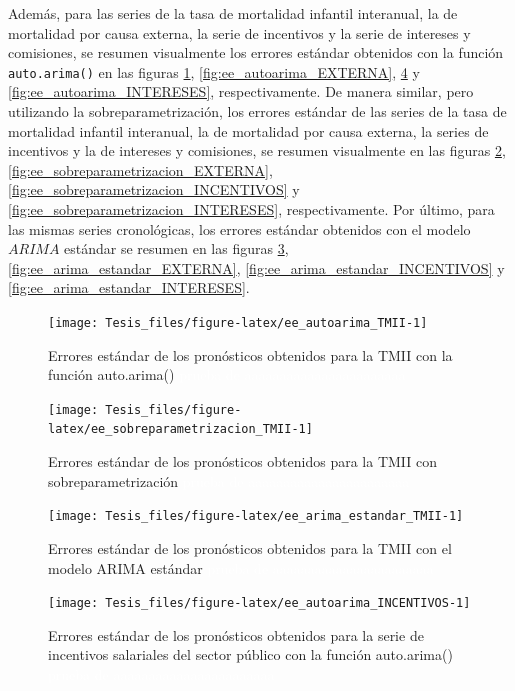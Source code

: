 \documentclass[
]{article}
\begin{document}
Además, para las series de la tasa de mortalidad infantil interanual, la
de mortalidad por causa externa, la serie de incentivos y la serie de
intereses y comisiones, se resumen visualmente los errores estándar
obtenidos con la función \texttt{auto.arima()} en las figuras
\ref{fig:ee_autoarima_TMII}, \ref{fig:ee_autoarima_EXTERNA},
\ref{fig:ee_autoarima_INCENTIVOS} y \ref{fig:ee_autoarima_INTERESES},
respectivamente. De manera similar, pero utilizando la
sobreparametrización, los errores estándar de las series de la tasa de
mortalidad infantil interanual, la de mortalidad por causa externa, la
series de incentivos y la de intereses y comisiones, se resumen
visualmente en las figuras \ref{fig:ee_sobreparametrizacion_TMII},
\ref{fig:ee_sobreparametrizacion_EXTERNA},
\ref{fig:ee_sobreparametrizacion_INCENTIVOS} y
\ref{fig:ee_sobreparametrizacion_INTERESES}, respectivamente. Por
último, para las mismas series cronológicas, los errores estándar
obtenidos con el modelo \(ARIMA\) estándar se resumen en las figuras
\ref{fig:ee_arima_estandar_TMII}, \ref{fig:ee_arima_estandar_EXTERNA},
\ref{fig:ee_arima_estandar_INCENTIVOS} y
\ref{fig:ee_arima_estandar_INTERESES}.

\begin{figure}[H]
\texttt{[image: Tesis\_files/figure-latex/ee\_autoarima\_TMII-1]} \caption{Errores estándar de los pronósticos obtenidos para la TMII con la función auto.arima() \textcolor{white}{prueba de aaaaaaaaaaaaaaaaaaaaaaa}}\label{fig:ee_autoarima_TMII}
\end{figure}

\begin{figure}[H]
\texttt{[image: Tesis\_files/figure-latex/ee\_sobreparametrizacion\_TMII-1]} \caption{Errores estándar de los pronósticos obtenidos para la TMII con sobreparametrización \textcolor{white}{prueba de aaaaaaaaaaaaaaaaaaaaaaa}}\label{fig:ee_sobreparametrizacion_TMII}
\end{figure}

\begin{figure}[H]
\texttt{[image: Tesis\_files/figure-latex/ee\_arima\_estandar\_TMII-1]} \caption{Errores estándar de los pronósticos obtenidos para la TMII con el modelo ARIMA estándar \textcolor{white}{prueba de aaaaaaaaaaaaaaaaaaaaaaa}}\label{fig:ee_arima_estandar_TMII}
\end{figure}

\begin{figure}[H]
\texttt{[image: Tesis\_files/figure-latex/ee\_autoarima\_INCENTIVOS-1]} \caption{Errores estándar de los pronósticos obtenidos para la serie de incentivos salariales del sector público con la función auto.arima() \textcolor{white}{prueba de aaaaaaaaaaaaaaaaaaaaaaa}}\label{fig:ee_autoarima_INCENTIVOS}
\end{figure}
\end{document}
